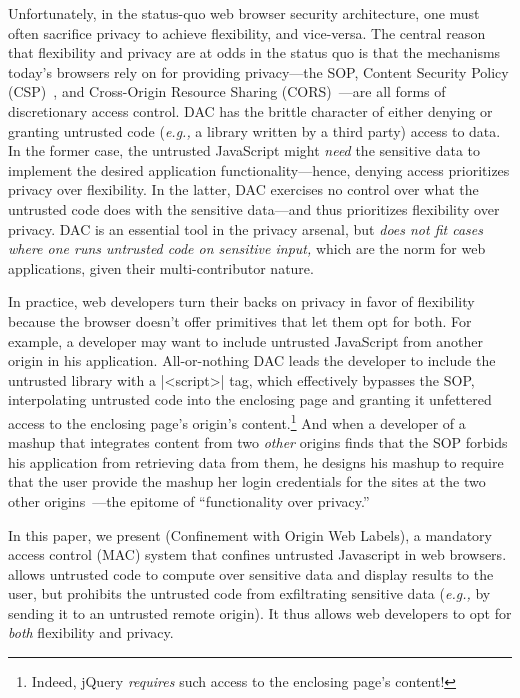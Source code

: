 Unfortunately, in the status-quo web browser security architecture,
one must often sacrifice privacy to achieve flexibility, and
vice-versa. The central reason that flexibility and privacy are at
odds in the status quo is that the mechanisms today's browsers rely on
for providing privacy---the SOP, Content Security Policy
(CSP)~\cite{csp}, and Cross-Origin Resource Sharing
(CORS)~\cite{cors13}---are all forms of discretionary access control.
DAC has the brittle character of either denying or granting
untrusted code (\emph{e.g.,} a library written by a third party) access to
data. In the former case, the untrusted JavaScript might {\em need}
the sensitive data to implement the desired application
functionality---hence, denying access prioritizes privacy over
flexibility. In the latter, DAC exercises no control over what the
untrusted code does with the sensitive data---and thus prioritizes
flexibility over privacy. DAC is an essential tool in the privacy
arsenal, but {\em does not fit cases where one runs untrusted code on
  sensitive input,} which are the norm for web applications, given
their multi-contributor nature.

In practice, web developers turn their backs on privacy in favor of
flexibility because the browser doesn't offer primitives that let them
opt for both. For example, a developer may want to include untrusted
JavaScript from another origin in his application. All-or-nothing DAC
leads the developer to include the untrusted library with a
\js|<script>| tag, which effectively bypasses the SOP, interpolating
untrusted code into the enclosing page and granting it unfettered
access to the enclosing page's origin's content.\footnote{Indeed,
  jQuery \emph{requires} such access to the enclosing page's content!}
And when a developer of a mashup that integrates content from two {\em
  other} origins finds that the SOP forbids his application from
retrieving data from them, he designs his mashup to require that the
user provide the mashup her login credentials for the sites at the two
other origins~\cite{mint.com}---the epitome of ``functionality over
privacy.''

In this paper, we present \sys{} (Confinement with Origin Web Labels),
a mandatory access control (MAC) system that confines untrusted
Javascript in web browsers. \sys{} allows untrusted code to compute
over sensitive data and display results to the user, but prohibits the
untrusted code from exfiltrating sensitive data (\emph{e.g.,} by sending it
to an untrusted remote origin). It thus allows web developers to opt
for {\em both} flexibility and privacy.

